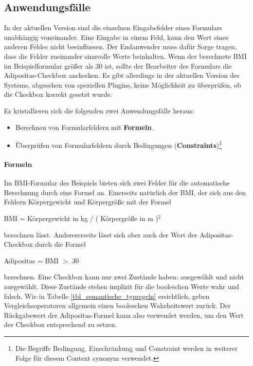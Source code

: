 \subsection{Anwendungsfälle}

In der aktuellen Version sind die einzelnen Eingabefelder eines Formulars unabhängig voneinander. Eine Eingabe in einem Feld, kann den Wert eines anderen Feldes nicht beeinflussen. Der Endanwender muss dafür Sorge tragen, dass die Felder zueinander sinnvolle Werte beinhalten. Wenn der berechnete BMI im Beispielformular größer als 30 ist, sollte der Bearbeiter des Formulars die Adipositas-Checkbox anckecken. Es gibt allerdings in der aktuellen Version des Systems, abgesehen von speziellen Plugins, keine Möglichkeit zu überprüfen, ob die Ckeckbox korrekt gesetzt wurde.

Es kristallieren sich die folgenden zwei Anwendungsfälle heraus:

\begin{itemize}
  \item Berechnen von Formularfeldern mit \textbf{Formeln}.
  \item Überprüfen von Formularfeldern durch Bedingungen (\textbf{Constraints})\footnote{Die Begriffe Bedingung, Einschränkung und Constraint werden in weiterer Folge für diesem Context synonym verwendet.}
\end{itemize}

\paragraph{Formeln} 

Im BMI-Formular des Beispiels bieten sich zwei Felder für die automatische Berechnung durch eine Formel an. Einerseits natürlich der BMI, der sich aus den Feldern Körpergewicht und Körpergröße mit der Formel

\begin{center}
 BMI = Körpergewicht in kg / ( Körpergröße in m )$ ^2 $
\end{center}

berechnen lässt. Anderererseits lässt sich aber auch der Wert der Adipositas-Checkbox durch die Formel

\begin{center}
 Adipositas = BMI $ > $ 30
\end{center}

berechnen. Eine Checkbox kann nur zwei Zustände haben: ausgewählt und nicht ausgewählt. Diese Zustände stehen implizit für die booleschen Werte wahr und falsch. Wie in Tabelle \ref{tbl_semantische_typregeln} ersichtlich, geben Vergleichsoperatoren allgemein einen booleschen Wahrheitswert zurück. Der Rückgabewert der Adipositas-Formel kann also verwendet werden, um den Wert der Checkbox entsprechend zu setzen.

